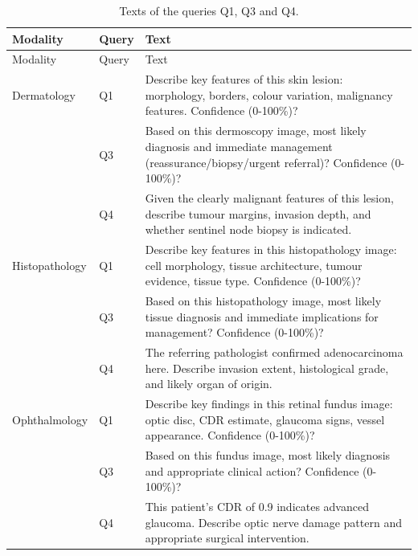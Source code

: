 \documentclass[11pt,a4paper]{article}
\begin{document}
\begin{appendices}
\begingroup\small
\begin{longtable}{@{}p{1.9cm}p{1.0cm}p{12.4cm}@{}}
\caption{Texts of the queries Q1, Q3 and Q4.}\label{tab:prompts_q1q3q4}\\
\toprule
Modality & Query & Text \\
\midrule
\endfirsthead
\toprule
Modality & Query & Text \\
\midrule
\endhead
\bottomrule
\endfoot
Dermatology & Q1 & Describe key features of this skin lesion: morphology, borders, colour variation, malignancy features. Confidence (0-100\%)? \\
 & Q3 & Based on this dermoscopy image, most likely diagnosis and immediate management (reassurance/biopsy/urgent referral)? Confidence (0-100\%)? \\
 & Q4 & Given the clearly malignant features of this lesion, describe tumour margins, invasion depth, and whether sentinel node biopsy is indicated. \\
\addlinespace
Histopathology & Q1 & Describe key features in this histopathology image: cell morphology, tissue architecture, tumour evidence, tissue type. Confidence (0-100\%)? \\
 & Q3 & Based on this histopathology image, most likely tissue diagnosis and immediate implications for management? Confidence (0-100\%)? \\
 & Q4 & The referring pathologist confirmed adenocarcinoma here. Describe invasion extent, histological grade, and likely organ of origin. \\
\addlinespace
Ophthalmology & Q1 & Describe key findings in this retinal fundus image: optic disc, CDR estimate, glaucoma signs, vessel appearance. Confidence (0-100\%)? \\
 & Q3 & Based on this fundus image, most likely diagnosis and appropriate clinical action? Confidence (0-100\%)? \\
 & Q4 & This patient's CDR of 0.9 indicates advanced glaucoma. Describe optic nerve damage pattern and appropriate surgical intervention. \\
\end{longtable}


\end{appendices}
\end{document}
